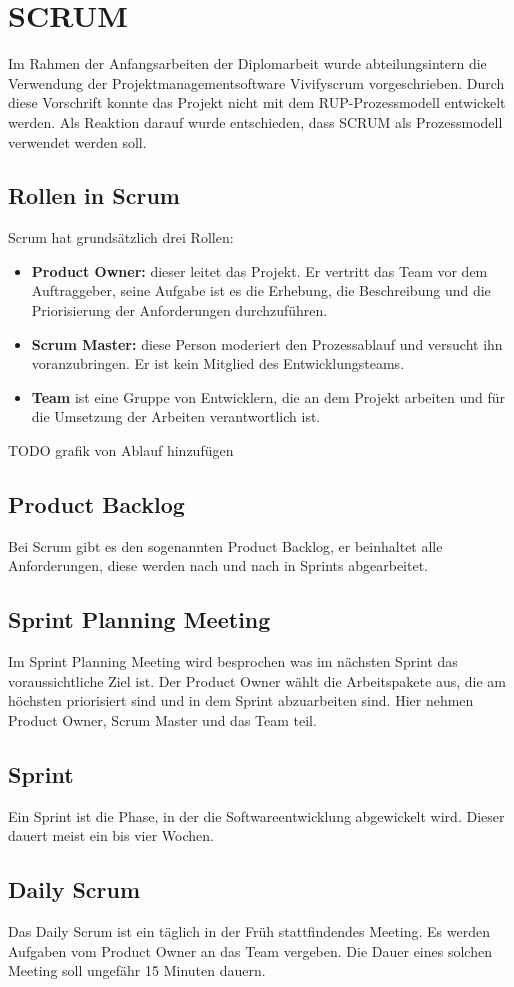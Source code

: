 \section{SCRUM}
Im Rahmen der Anfangsarbeiten der Diplomarbeit wurde abteilungsintern die Verwendung der Projektmanagementsoftware Vivifyscrum vorgeschrieben. Durch diese Vorschrift konnte das Projekt nicht mit dem RUP-Prozessmodell entwickelt werden. 
Als Reaktion darauf wurde entschieden, dass SCRUM als Prozessmodell verwendet werden soll.
\subsection{Rollen in Scrum}
Scrum hat grundsätzlich drei Rollen:
\begin{itemize} 
	\item \textbf{Product Owner:} dieser leitet das Projekt. Er vertritt das Team vor dem Auftraggeber, seine Aufgabe ist es die Erhebung, die Beschreibung und die Priorisierung der Anforderungen durchzuführen.
	\item \textbf{Scrum Master:} diese Person moderiert den Prozessablauf und versucht ihn voranzubringen. Er ist kein Mitglied des Entwicklungsteams.
	\item \textbf{Team} ist eine Gruppe von Entwicklern, die an dem Projekt arbeiten und für die Umsetzung der Arbeiten verantwortlich ist.
\end{itemize}
TODO grafik von Ablauf hinzufügen
\subsection{Product Backlog}
Bei Scrum gibt es den sogenannten Product Backlog, er beinhaltet alle Anforderungen, diese werden nach und nach in Sprints abgearbeitet.
\subsection{Sprint Planning Meeting}
Im Sprint Planning Meeting wird besprochen was im nächsten Sprint das voraussichtliche Ziel ist. Der Product Owner wählt die Arbeitspakete aus, die am höchsten priorisiert sind und in dem Sprint abzuarbeiten sind. Hier nehmen Product Owner, Scrum Master und das Team teil. 
\subsection{Sprint}
Ein Sprint ist die Phase, in der die Softwareentwicklung abgewickelt wird. Dieser dauert meist ein bis vier Wochen. 
\subsection{Daily Scrum}
Das Daily Scrum ist ein täglich in der Früh stattfindendes Meeting. Es werden Aufgaben vom Product Owner an das Team vergeben. Die Dauer eines solchen Meeting soll ungefähr 15 Minuten dauern.
